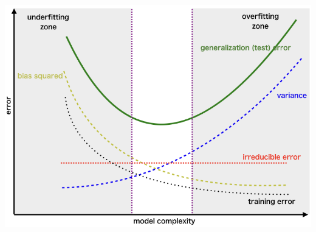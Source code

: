 \documentclass[a4paper]{article}
\newenvironment{Figure}
  {\par\medskip\noindent\minipage{\linewidth}}
  {\endminipage\par\medskip}
\begin{document}
\begin{landscape}
\begin{multicols}{3}
\begin{itemize}[noitemsep,nolistsep,leftmargin=*]
\begin{itemize}[noitemsep,nolistsep,leftmargin=*]
            \end{itemize}
        \end{itemize}
        \begin{Figure}
            \centering
            \includegraphics[width=0.75\linewidth]{bv_tradeoff.png}
        \end{Figure}




\end{multicols}
\end{landscape}
\end{document}
